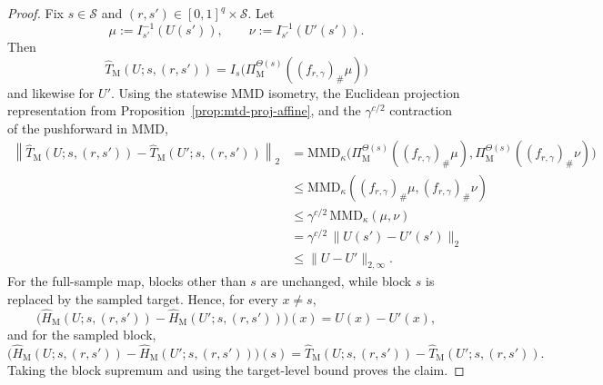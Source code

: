 \documentclass{article}
\newcommand{\X}{\mathcal{S}}
\begin{document}
\begin{proof}
Fix $s\in \X$ and $(r,s')\in[0,1]^q\times \X$. Let
\begin{equation}
\mu:=I_{s'}^{-1}(U(s')), \qquad \nu:=I_{s'}^{-1}(U'(s')).
\end{equation}
Then
\begin{equation}
\widehat T_{\mathrm M}(U;s,(r,s')) = I_s\bigl(\Pi_{\mathrm M}^{\Theta(s)}((f_{r,\gamma})_\# \mu)\bigr)
\end{equation}
and likewise for $U'$. Using the statewise MMD isometry, the Euclidean projection representation from Proposition~\ref{prop:mtd-proj-affine}, and the $\gamma^{c/2}$ contraction of the pushforward in MMD,
\begin{equation}
\begin{aligned}
\left\lVert \widehat T_{\mathrm M}(U;s,(r,s')) - \widehat T_{\mathrm M}(U';s,(r,s')) \right\rVert_2 &= \mathrm{MMD}_\kappa\bigl( \Pi_{\mathrm M}^{\Theta(s)}((f_{r,\gamma})_\# \mu), \Pi_{\mathrm M}^{\Theta(s)}((f_{r,\gamma})_\# \nu) \bigr) \\ 
&\le \mathrm{MMD}_\kappa((f_{r,\gamma})_\# \mu,(f_{r,\gamma})_\# \nu) \\ 
&\le \gamma^{c/2}\,\mathrm{MMD}_\kappa(\mu,\nu) \\ 
&= \gamma^{c/2}\,\lVert U(s')-U'(s') \rVert_2 \\ 
&\le \lVert U-U'\rVert_{2,\infty}.
\end{aligned}
\end{equation}
For the full-sample map, blocks other than $s$ are unchanged, while block $s$ is replaced by the sampled target. Hence, for every $x \neq s$,
\begin{equation}
\bigl(\widehat H_{\mathrm M}(U;s,(r,s'))-\widehat H_{\mathrm M}(U';s,(r,s'))\bigr)(x) = U(x)-U'(x),
\end{equation}
and for the sampled block,
\begin{equation}
\bigl(\widehat H_{\mathrm M}(U;s,(r,s'))-\widehat H_{\mathrm M}(U';s,(r,s'))\bigr)(s) = \widehat T_{\mathrm M}(U;s,(r,s'))-\widehat T_{\mathrm M}(U';s,(r,s')).
\end{equation}
Taking the block supremum and using the target-level bound proves the claim.
\end{proof}
\end{document}
